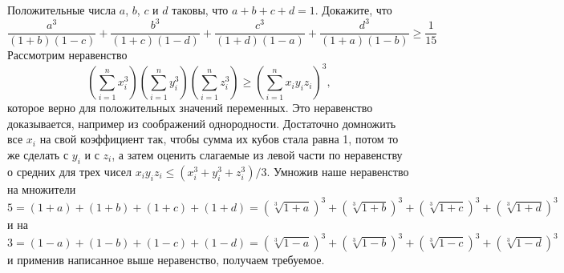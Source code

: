 \problem{}
Положительные числа $a$, $b$, $c$ и $d$ таковы, что $a + b + c + d = 1$.
Докажите, что 
\[
    \frac{a^3}{(1 + b) (1 - c)}
    +
    \frac{b^3}{(1 + c) (1 - d)}
    +
    \frac{c^3}{(1 + d) (1 - a)}
    +
    \frac{d^3}{(1 + a) (1 - b)}
\geq
    \frac{1}{15}
\]
\solution
Рассмотрим неравенство 
\[
    (\sum_{i = 1}^n x_i^3)
    (\sum_{i = 1}^n y_i^3)
    (\sum_{i = 1}^n z_i^3)
\geq
    (\sum_{i = 1}^n x_i y_i z_i)^3
,\]
которое верно для положительных значений переменных.
Это неравенство доказывается, например из соображений однородности.
Достаточно домножить все $x_i$ на свой коэффициент так, чтобы сумма их кубов
стала равна 1, потом то же сделать с $y_i$ и с $z_i$, а затем оценить
слагаемые из левой части по неравенству о средних для трех чисел
$x_i y_i z_i \leq (x_i^3 + y_i^3 + z_i^3) / 3$.
Умножив наше неравенство на множители
\[
    5
=
    (1 + a) + (1 + b) + (1 + c) + (1 + d)
=
    (\sqrt[3]{1 + a})^3
    +
    (\sqrt[3]{1 + b})^3
    +
    (\sqrt[3]{1 + c})^3
    +
    (\sqrt[3]{1 + d})^3
\]
и на
\[
    3 = (1 - a) + (1 - b) + (1 - c) + (1 - d)
=
    (\sqrt[3]{1 - a})^3
    +
    (\sqrt[3]{1 - b})^3
    +
    (\sqrt[3]{1 - c})^3
    +
    (\sqrt[3]{1 - d})^3
\]
и применив написанное выше неравенство, получаем требуемое.
\endproblem
